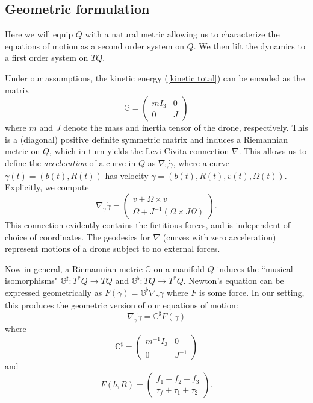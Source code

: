 \documentclass{aims}
\theoremstyle{definition}
\begin{document}
\subsection{Geometric formulation}
Here we will equip $Q$ with a natural metric allowing us to characterize the equations of motion as a second order system on $Q$.  We then lift the dynamics to a first order system on $TQ$.  %

Under our assumptions, the kinetic energy (\ref{kinetic total}) can be encoded as the matrix
$$ \mathbb G = 
\begin{pmatrix}
mI_3 & 0 \\ 0 & J
\end{pmatrix}$$
where $m$ and $J$ denote the mass and inertia tensor of the drone, respectively.
This is a (diagonal) positive definite symmetric matrix and induces a Riemannian metric on $Q$, which in turn yields the Levi-Civita connection $\nabla$.  This allows us to define the \textit{acceleration} of a curve in $Q$ as $\nabla_{\dot{\gamma}} \dot{\gamma}$, where a curve $\gamma(t) = (b(t), R(t))$ has velocity $\dot{\gamma} = (b(t), R(t), v(t), \Omega(t))$.  Explicitly, we compute
$$\nabla_{\dot{\gamma}} \dot{\gamma} = 
\begin{pmatrix}
\dot{v} + \Omega \times v \\ \dot \Omega + J^{-1}(\Omega \times J\Omega)
\end{pmatrix}.
$$
This connection evidently contains the fictitious forces, and is independent of choice of coordinates.  The geodesics for $\nabla$ (curves with zero acceleration) represent motions of a drone subject to no external forces.

Now in general, a Riemannian metric $\mathbb G$ on a manifold $Q$ induces the ``musical isomorphisms"  $\mathbb G^{\sharp}: T^*Q \to TQ$ and $\mathbb G^{\flat}: TQ \to T^*Q$.
Newton's equation can be expressed geometrically as $F(\gamma) = \mathbb G^{\flat} \nabla_{\dot{\gamma}} \dot{\gamma}$ where $F$ is some force.  In our setting, this produces the geometric version of our equations of motion:
\begin{equation}
 \nabla_{\dot{\gamma}} \dot{\gamma} =   \mathbb G^{\sharp}F(\gamma) \label{geometric eqns}
\end{equation}
where
$$ \mathbb G^{\sharp} = 
\begin{pmatrix}
m^{-1}I_3 & 0 \\ 0 & J^{-1}
\end{pmatrix}$$
and 
$$ F(b, R) = 
\begin{pmatrix}
f_1 +f_2 +f_3  \\  \tau_f + \tau_1 + \tau_2
\end{pmatrix}.$$
\end{document}
